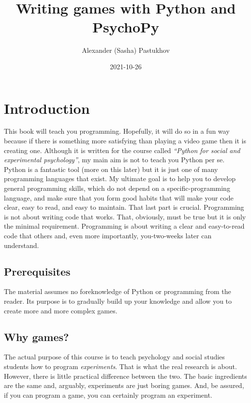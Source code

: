 \documentclass[
]{book}
\title{Writing games with Python and PsychoPy}
\author{Alexander (Sasha) Pastukhov}
\date{2021-10-26}
\begin{document}
\maketitle

{
\setcounter{tocdepth}{1}
\tableofcontents
}
\hypertarget{intro}{%
\chapter{Introduction}\label{intro}}

This book will teach you programming. Hopefully, it will do so in a fun way because if there is something more satisfying than playing a video game then it is creating one. Although it is written for the course called \emph{``Python for social and experimental psychology''}, my main aim is not to teach you Python per se. Python is a fantastic tool (more on this later) but it is just one of many programming languages that exist. My ultimate goal is to help you to develop general programming skills, which do not depend on a specific-programming language, and make sure that you form good habits that will make your code clear, easy to read, and easy to maintain. That last part is crucial. Programming is not about writing code that works. That, obviously, must be true but it is only the minimal requirement. Programming is about writing a clear and easy-to-read code that others and, even more importantly, you-two-weeks later can understand.

\hypertarget{prerequisites}{%
\section{Prerequisites}\label{prerequisites}}

The material assumes no foreknowledge of Python or programming from the reader. Its purpose is to gradually build up your knowledge and allow you to create more and more complex games.

\hypertarget{why-games}{%
\section{Why games?}\label{why-games}}

The actual purpose of this course is to teach psychology and social studies students how to program \emph{experiments}. That is what the real research is about. However, there is little practical difference between the two. The basic ingredients are the same and, arguably, experiments are just boring games. And, be assured, if you can program a game, you can certainly program an experiment.
\end{document}
